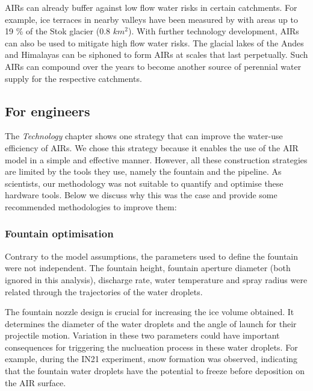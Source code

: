 \ac{AIRs} can already buffer against low flow water risks in certain catchments. For example, ice terraces in
nearby valleys have been measured by \citet{nusserSociohydrologyArtificialGlaciers2019} with areas up to 19 \%
of the Stok glacier (0.8 $km^2$). With further technology development, \ac{AIRs} can also be used to mitigate high
flow water risks. The glacial lakes of the Andes and Himalayas can be siphoned to form AIRs at scales that last
perpetually. Such \ac{AIRs} can compound over the years to become another source of perennial water supply for the
respective catchments.

\subsection{For engineers}

The \textit{Technology} chapter shows one strategy that can improve the water-use efficiency of \ac{AIRs}. We chose
this strategy because it enables the use of the \ac{AIR} model in a simple and effective manner. However, all these
construction strategies are limited by the tools they use, namely the fountain and the pipeline. As scientists,
our methodology was not suitable to quantify and optimise these hardware tools. Below we discuss why this was
the case and provide some recommended methodologies to improve them:

\subsubsection{Fountain optimisation}

Contrary to the model assumptions, the parameters used to define the fountain were not independent. The fountain
height, fountain aperture diameter (both ignored in this analysis), discharge rate, water temperature and spray
radius were related through the trajectories of the water droplets.

The fountain nozzle design is crucial for increasing the ice volume obtained. It determines the diameter of the
water droplets and the angle of launch for their projectile motion. Variation in these two parameters could have
important consequences for triggering the nuclueation process in these water droplets. For example, during the IN21
experiment, snow formation was observed, indicating that the fountain water droplets have the potential to
freeze before deposition on the AIR surface. 

